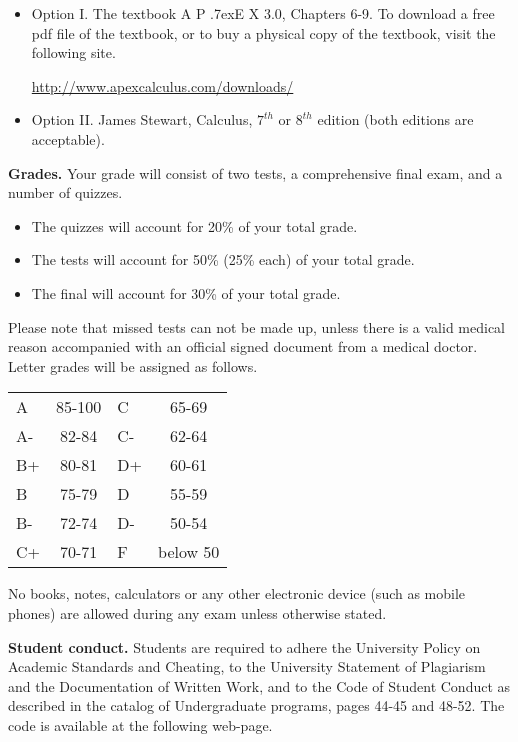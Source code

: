 \documentclass{article}
\newcommand{\apex}{A\kern -1pt \lower -2pt\hbox{P}\kern -4pt \lower .7ex\hbox{E}\kern -1pt X}
\begin{document}
\begin{itemize}
\item Option I. The textbook \apex{} 3.0, Chapters 6-9. To download a free pdf file of the textbook, or to buy a physical copy of the textbook, visit the following site.

\url{http://www.apexcalculus.com/downloads/} 
\item Option II. James Stewart, Calculus, $7^{th}$ or $8^{th}$ edition (both editions are acceptable).
\end{itemize}



\medskip
\noindent \textbf{Grades.} Your grade will consist of two tests, a comprehensive final exam, and a number of quizzes. 
\begin{itemize}
\item The quizzes will account for 20\% of your total grade.
\item The tests will account for 50\% (25\% each) of your total grade.
\item The final will account for 30\% of your total grade.
\end{itemize}
Please note that missed tests can not be made up, unless there is a valid medical reason accompanied with an official signed document from a medical doctor. Letter grades will be assigned as follows. 

\begin{center}
\begin{tabular}{lc|lc}
A & 85-100 & C & 65-69 \\
A-& 82-84 & C- & 62-64 \\
B+& 80-81 & D+ & 60-61 \\
B & 75-79& D & 55-59\\
B-& 72-74& D- & 50-54\\
C+& 70-71& F & below 50\\
\end{tabular}

\end{center}

No books, notes, calculators or any other electronic device (such as mobile phones) are allowed during any exam unless otherwise stated.

\medskip
\noindent \textbf{Student conduct.} Students  are required to adhere the University Policy on Academic Standards and Cheating, to the University Statement of Plagiarism and the Documentation of Written Work, and to the Code of Student Conduct as described in the catalog of Undergraduate programs, pages 44-45 and 48-52. The code is available at the following web-page.
\end{document}
